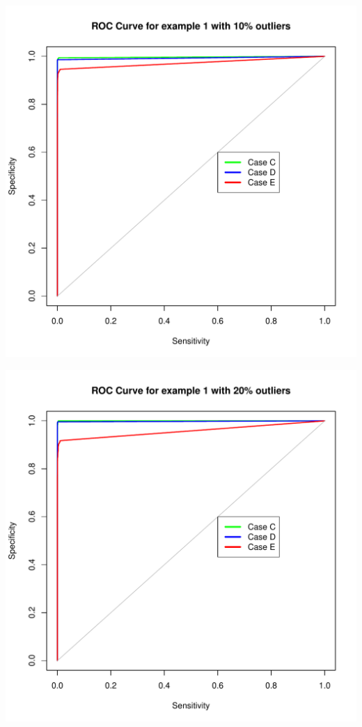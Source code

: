 \documentclass{article}\usepackage[]{graphicx}\usepackage[]{color}
\makeatletter
\def\maxwidth{ %
  \ifdim\Gin@nat@width>\linewidth
    \linewidth
  \else
    \Gin@nat@width
  \fi
}
\newenvironment{knitrout}{}{} %
\makeatother
\begin{document}
\begin{knitrout}
\color{fgcolor}
\includegraphics[width=\maxwidth]{figure/unnamed-chunk-2-1} 

\end{knitrout}
\begin{knitrout}
\color{fgcolor}
\includegraphics[width=\maxwidth]{figure/unnamed-chunk-3-1} 

\end{knitrout}
\end{document}
